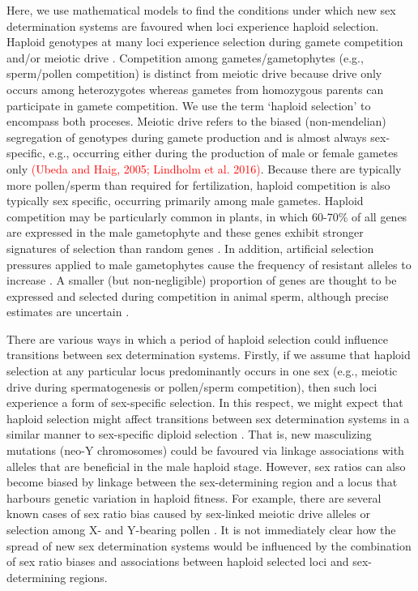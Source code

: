 \documentclass[12pt]{article}
\begin{document}
Here, we use mathematical models to find the conditions under which new sex determination systems are favoured when loci experience haploid selection. 
Haploid genotypes at many loci experience selection during gamete competition and/or meiotic drive \citep{Mulcahy:1996ha,JOSEPH:2004haa}.
Competition among gametes/gametophytes (e.g., sperm/pollen competition) is distinct from meiotic drive because drive only occurs among heterozygotes whereas gametes from homozygous parents can participate in gamete competition. 
We use the term `haploid selection' to encompass both proceses. 
Meiotic drive refers to the biased (non-mendelian) segregation of genotypes during gamete production and is almost always sex-specific, e.g., occurring either during the production of male or female gametes only \textcolor{red}{(Ubeda and Haig, 2005; Lindholm et al. 2016)}.
Because there are typically more pollen/sperm than required for fertilization, haploid competition is also typically sex specific, occurring primarily among male gametes.
Haploid competition may be particularly common in plants, in which 60-70\% of all genes are expressed in the male gametophyte and these genes exhibit stronger signatures of selection than random genes \citep{Borg:2009jpa,Arunkumar:2013iq,Gossmann:2014dua}.
In addition, artificial selection pressures applied to male gametophytes cause the frequency of resistant alleles to increase \citep[e.g.,][]{Hormaza:1996cv,Ravikumar:2003uo,Hedhly:2004iv,Clarke:2004ir}. 
A smaller (but non-negligible) proportion of genes are thought to be expressed and selected during competition in animal sperm, although precise estimates are uncertain \citep{Zheng:2001fi,JOSEPH:2004haa,Vibranovski:2010et}. 

There are various ways in which a period of haploid selection could influence transitions between sex determination systems. 
Firstly, if we assume that haploid selection at any particular locus predominantly occurs in one sex (e.g., meiotic drive during spermatogenesis or pollen/sperm competition), then such loci experience a form of sex-specific selection. 
In this respect, we might expect that haploid selection might affect transitions between sex determination systems in a similar manner to sex-specific diploid selection \citep[as explored by][]{vanDoorn:2007eu,vanDoorn:2010hu}. 
That is, new masculizing mutations (neo-Y chromosomes) could be favoured via linkage associations with alleles that are beneficial in the male haploid stage. 
However, sex ratios can also become biased by linkage between the sex-determining region and a locus that harbours genetic variation in haploid fitness. 
For example, there are several known cases of sex ratio bias caused by sex-linked meiotic drive alleles \citep[][, Chapter 3]{Burt:2006} or selection among X- and Y-bearing pollen \citep{Lloyd:1974tz,Conn:1981uw,Stehlik:2005ul,Stehlik:2006to,Field:2012fd,Field:2013cc}. 
It is not immediately clear how the spread of new sex determination systems would be influenced by the combination of sex ratio biases and associations between haploid selected loci and sex-determining regions. 
\end{document}
